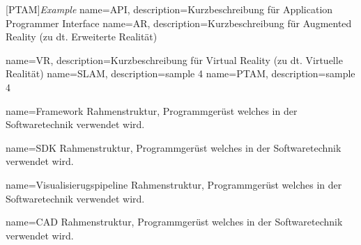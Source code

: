 [PTAM]{\emph{Example}}
{
	name={API},
	description={Kurzbeschreibung für Application Programmer Interface}
}
{
	name={AR},
	description={Kurzbeschreibung für Augmented Reality (zu dt. Erweiterte Realität)}
}

{
	name={VR},
	description={Kurzbeschreibung für Virtual Reality (zu dt. Virtuelle Realität)}
}
{
	name={SLAM},
	description={sample 4}
}
{
	name={PTAM},
	description={sample 4}
}



{
	name=Framework
}
{Rahmenstruktur, Programmgerüst welches in der Softwaretechnik verwendet wird.}

{
	name=SDK
}
{Rahmenstruktur, Programmgerüst welches in der Softwaretechnik verwendet wird.}

{
	name=Visualisierugspipeline
}
{Rahmenstruktur, Programmgerüst welches in der Softwaretechnik verwendet wird.}

{
	name=CAD
}
{Rahmenstruktur, Programmgerüst welches in der Softwaretechnik verwendet wird.}